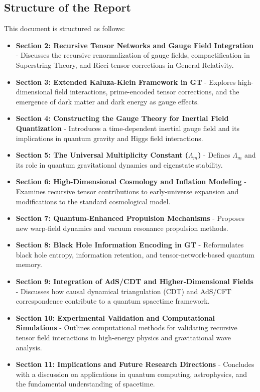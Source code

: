 \documentclass{article}
\theoremstyle{plain}
\begin{document}
\subsection{Structure of the Report}
This document is structured as follows:
\begin{itemize}
    \item \textbf{Section 2: Recursive Tensor Networks and Gauge Field Integration} - Discusses the recursive renormalization of gauge fields, compactification in Superstring Theory, and Ricci tensor corrections in General Relativity.
    \item \textbf{Section 3: Extended Kaluza-Klein Framework in GT} - Explores high-dimensional field interactions, prime-encoded tensor corrections, and the emergence of dark matter and dark energy as gauge effects.
    \item \textbf{Section 4: Constructing the Gauge Theory for Inertial Field Quantization} - Introduces a time-dependent inertial gauge field and its implications in quantum gravity and Higgs field interactions.
    \item \textbf{Section 5: The Universal Multiplicity Constant ($\Lambda_m$)} - Defines $\Lambda_m$ and its role in quantum gravitational dynamics and eigenstate stability.
    \item \textbf{Section 6: High-Dimensional Cosmology and Inflation Modeling} - Examines recursive tensor contributions to early-universe expansion and modifications to the standard cosmological model.
    \item \textbf{Section 7: Quantum-Enhanced Propulsion Mechanisms} - Proposes new warp-field dynamics and vacuum resonance propulsion methods.
    \item \textbf{Section 8: Black Hole Information Encoding in GT} - Reformulates black hole entropy, information retention, and tensor-network-based quantum memory.
    \item \textbf{Section 9: Integration of AdS/CDT and Higher-Dimensional Fields} - Discusses how causal dynamical triangulation (CDT) and AdS/CFT correspondence contribute to a quantum spacetime framework.
    \item \textbf{Section 10: Experimental Validation and Computational Simulations} - Outlines computational methods for validating recursive tensor field interactions in high-energy physics and gravitational wave analysis.
    \item \textbf{Section 11: Implications and Future Research Directions} - Concludes with a discussion on applications in quantum computing, astrophysics, and the fundamental understanding of spacetime.
\end{itemize}
\end{document}
